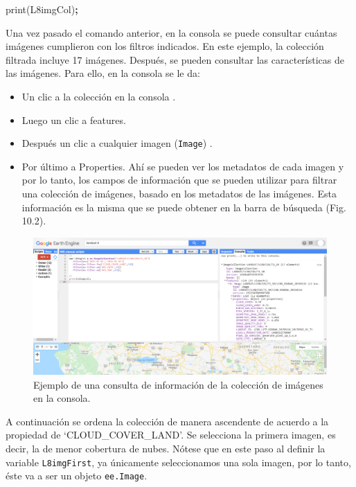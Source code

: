 \documentclass[
  12pt,
  letterpaper,
  twoside]{book}
\newenvironment{Shaded}{\begin{snugshade}}{\end{snugshade}}
\newcommand{\FunctionTok}[1]{\textcolor[rgb]{0.00,0.00,0.00}{#1}}
\newcommand{\NormalTok}[1]{#1}
\newcommand{\OperatorTok}[1]{\textcolor[rgb]{0.81,0.36,0.00}{\textbf{#1}}}
\providecommand{\tightlist}{%
  \setlength{\itemsep}{0pt}\setlength{\parskip}{0pt}}
\begin{document}
\begin{Shaded}
\begin{Highlighting}[]
\FunctionTok{print}\NormalTok{(L8imgCol)}\OperatorTok{;}
\end{Highlighting}
\end{Shaded}

Una vez pasado el comando anterior, en la consola se puede consultar cuántas imágenes cumplieron con los filtros indicados. En este ejemplo, la colección filtrada incluye 17 imágenes. Después, se pueden consultar las características de las imágenes. Para ello, en la consola se le da:

\begin{itemize}
\tightlist
\item
  Un clic a la colección en la consola .
\item
  Luego un clic a features.
\item
  Después un clic a cualquier imagen (\texttt{Image}) .
\item
  Por último a Properties. Ahí se pueden ver los metadatos de cada imagen y por lo tanto, los campos de información que se pueden utilizar para filtrar una colección de imágenes, basado en los metadatos de las imágenes. Esta información es la misma que se puede obtener en la barra de búsqueda (Fig. 10.2).
\end{itemize}

\begin{figure}[btp]

{\centering \includegraphics[width=1\linewidth]{Img/CamposImgCol} 

}

\caption{Ejemplo de una consulta de información de la colección de imágenes en la consola.}\label{fig:unnamed-chunk-158}
\end{figure}

A continuación se ordena la colección de manera ascendente de acuerdo a la propiedad de `CLOUD\_COVER\_LAND'. Se selecciona la primera imagen, es decir, la de menor cobertura de nubes. Nótese que en este paso al definir la variable \texttt{L8imgFirst}, ya únicamente seleccionamos una sola imagen, por lo tanto, éste va a ser un objeto \texttt{ee.Image}.
\end{document}
